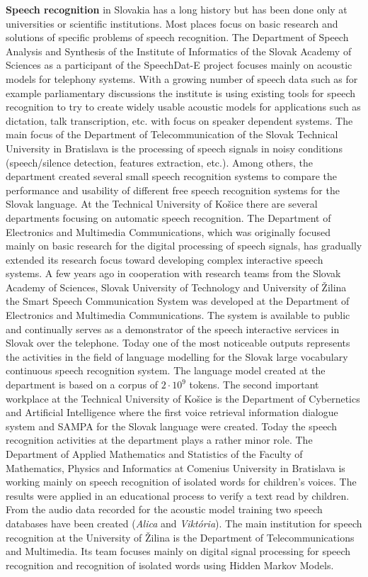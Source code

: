 \begin{multicols}{2}
\textbf{Speech recognition} in Slovakia has a long history but has been done only at universities or scientific institutions. Most places focus on basic research and solutions of specific problems of speech recognition. The Department of Speech Analysis and Synthesis of the Institute of Informatics of the Slovak Academy of Sciences as a participant of the SpeechDat-E project focuses mainly on acoustic models for telephony systems. With a growing number of speech data such as for example parliamentary discussions the institute is using existing tools for speech recognition to try to create widely usable acoustic models for applications such as dictation, talk transcription, etc. with focus on speaker dependent systems. The main focus of the Department of Telecommunication of the Slovak Technical University in Bratislava is the processing of speech signals in noisy conditions (speech/silence detection, features extraction, etc.). Among others, the department created several small speech recognition systems to compare the performance and usability of different free speech recognition systems for the Slovak language. At the Technical University of Košice there are several departments focusing on automatic speech recognition. The Department of Electronics and Multimedia Communications, which was originally focused mainly on basic research for the digital processing of speech signals, has gradually extended its research focus toward developing complex interactive speech systems. A few years ago in cooperation with research teams from the Slovak Academy of Sciences, Slovak University of Technology and University of Žilina the Smart Speech Communication System was developed at the Department of Electronics and Multimedia Communications. The system is available to public and continually serves as a demonstrator of the speech interactive services in Slovak over the telephone. Today one of the most noticeable outputs represents the activities in the field of language modelling for the Slovak large vocabulary continuous speech recognition system. The language model created at the department is based on a corpus of $2\cdot 10^9$ tokens. 
\newline The second important workplace at the Technical University of Košice is the Department of Cybernetics and Artificial Intelligence where the first voice retrieval information dialogue system and SAMPA for the Slovak language were created. Today the speech recognition activities at the department plays a rather minor role. The Department of Applied Mathematics and Statistics of the Faculty of Mathematics, Physics and Informatics at Comenius University in Bratislava is working mainly on speech recognition of isolated words for children's voices. The results were applied in an educational process to verify a text read by children. From the audio data recorded for the acoustic model training two speech databases have been created (\emph{Alica} and \emph{Viktória}).  The main institution for speech recognition at the University of Žilina is the Department of Telecommunications and Multimedia. Its team focuses mainly on digital signal processing for speech recognition and recognition of isolated words using Hidden Markov Models.


\end{multicols}
